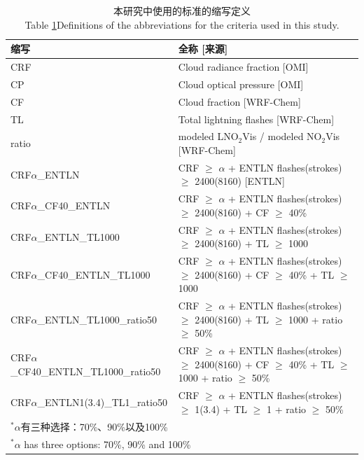 \begin{table}[h]
\scriptsize
\caption{本研究中使用的标准的缩写定义\\Table \ref{table:Abbreviations}Definitions of the abbreviations for the criteria used in this study.}
\begin{tabular}{ll}
\hline
\textbf{缩写} & \textbf{全称 [来源]} \\
\hline
CRF                             & Cloud radiance fraction [OMI] \\
CP                              & Cloud optical pressure [OMI] \\
CF                              & Cloud fraction [WRF-Chem] \\
TL                              & Total lightning flashes [WRF-Chem] \\
ratio                           & modeled LNO$_2$Vis / modeled NO$_2$Vis [WRF-Chem] \\
CRF$\alpha$\_ENTLN                    & CRF $\geq$ $\alpha$ + ENTLN flashes(strokes) $\geq$ 2400(8160) [ENTLN]\\
CRF$\alpha$\_CF40\_ENTLN              & CRF $\geq$ $\alpha$ + ENTLN flashes(strokes) $\geq$ 2400(8160) + CF $\geq$ 40\% \\
CRF$\alpha$\_ENTLN\_TL1000            & CRF $\geq$ $\alpha$ + ENTLN flashes(strokes) $\geq$ 2400(8160) + TL $\geq$ 1000 \\
CRF$\alpha$\_CF40\_ENTLN\_TL1000      & CRF $\geq$ $\alpha$ + ENTLN flashes(strokes) $\geq$ 2400(8160) + CF $\geq$ 40\% + TL $\geq$ 1000 \\
CRF$\alpha$\_ENTLN\_TL1000\_ratio50   & CRF $\geq$ $\alpha$ + ENTLN flashes(strokes) $\geq$ 2400(8160) + TL $\geq$ 1000 + ratio $\geq$ 50\% \\
CRF$\alpha$\_CF40\_ENTLN\_TL1000\_ratio50 & CRF $\geq$ $\alpha$ + ENTLN flashes(strokes) $\geq$ 2400(8160) + CF $\geq$ 40\% + TL $\geq$ 1000 + ratio $\geq$ 50\% \\
CRF$\alpha$\_ENTLN1(3.4)\_TL1\_ratio50    & CRF $\geq$ $\alpha$ + ENTLN flashes(strokes) $\geq$ 1(3.4) + TL $\geq$ 1 + ratio $\geq$ 50\% \\
\hline
\multicolumn{2}{l}{$^{*}$$\alpha$有三种选择：70\%、90\%以及100\%} \\
\multicolumn{2}{l}{$^{*}$$\alpha$ has three options: 70\%, 90\% and 100\%}
\end{tabular}
\label{table:Abbreviations}
\end{table}


